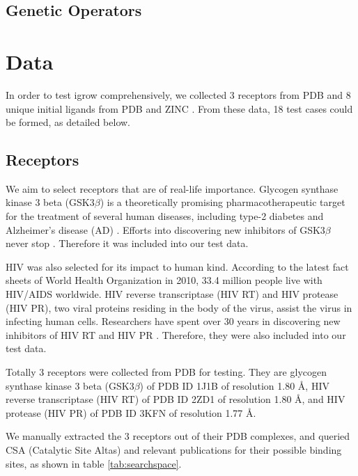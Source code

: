 \documentclass[10pt, conference, compsocconf]{../IEEEtran}
\begin{document}
\subsection{Genetic Operators}



\section{Data}

In order to test igrow comprehensively, we collected 3 receptors from PDB \cite{96} and 8 unique initial ligands from PDB and ZINC \cite{55}. From these data, 18 test cases could be formed, as detailed below.

\subsection{Receptors}

We aim to select receptors that are of real-life importance. Glycogen synthase kinase 3 beta (GSK3$\beta$) is a theoretically promising pharmacotherapeutic target for the treatment of several human diseases, including type-2 diabetes \cite{247} and Alzheimer's disease (AD) \cite{248}. Efforts into discovering new inhibitors of GSK3$\beta$ never stop \cite{246}. Therefore it was included into our test data.

HIV was also selected for its impact to human kind. According to the latest fact sheets of World Health Organization in 2010, 33.4 million people live with HIV/AIDS worldwide. HIV reverse transcriptase (HIV RT) and HIV protease (HIV PR), two viral proteins residing in the body of the virus, assist the virus in infecting human cells. Researchers have spent over 30 years in discovering new inhibitors of HIV RT and HIV PR \cite{221,222,223}. Therefore, they were also included into our test data.

Totally 3 receptors were collected from PDB \cite{96} for testing. They are glycogen synthase kinase 3 beta (GSK3$\beta$) of PDB ID 1J1B \cite{245} of resolution 1.80 \AA, HIV reverse transcriptase (HIV RT) of PDB ID 2ZD1 \cite{180} of resolution 1.80 \AA, and HIV protease (HIV PR) of PDB ID 3KFN \cite{243} of resolution 1.77 \AA.

We manually extracted the 3 receptors out of their PDB complexes, and queried CSA (Catalytic Site Altas) \cite{206} and relevant publications \cite{245,246,180,221,222,223,243} for their possible binding sites, as shown in table \ref{tab:searchspace}.
\end{document}
